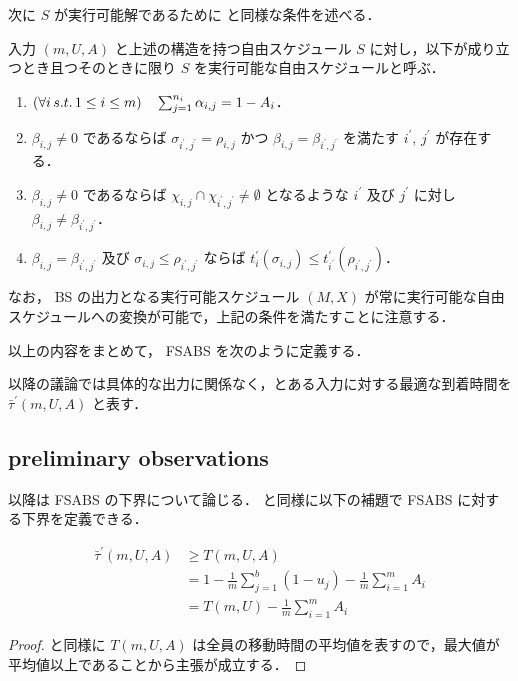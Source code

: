 次に $S$ が実行可能解であるために \textcite{czyzowicz} と同様な条件を述べる．
\begin{definition}
  入力 $(m, U, A)$ と上述の構造を持つ自由スケジュール $S$ に対し，以下が成り立つとき且つそのときに限り $S$ を実行可能な自由スケジュールと呼ぶ．
  \begin{enumerate}
  \item $(\forall i\,s.t.\, 1 \leq i \leq m)\quad \sum_{j=1}^{n_i} \alpha_{i,j} = 1 - A_i$．
  \item $\beta_{i,j} \neq 0$ であるならば $\sigma_{i^\prime, j^\prime} = \rho_{i,j} \text{ かつ } \beta_{i,j} = \beta_{i^\prime, j^\prime}$ を満たす $i^\prime$, $j^\prime$ が存在する．
  \item $\beta_{i,j} \neq 0$ であるならば $\chi_{i,j} \cap \chi_{i^\prime,j^\prime} \neq \emptyset$ となるような $i^\prime$ 及び $j^\prime$ に対し $\beta_{i,j} \neq \beta_{i^\prime,j ^\prime}$．
  \item $\beta_{i,j} = \beta_{i^\prime, j^\prime}$ 及び $\sigma_{i,j} \leq \rho_{i^\prime, j^{\prime}}$ ならば $t^{\prime}_i(\sigma_{i, j}) \leq t^{\prime}_{i^\prime}(\rho_{i^\prime, j^\prime})$．
  \end{enumerate}
\end{definition}
なお， BS の出力となる実行可能スケジュール $(M, X)$ が常に実行可能な自由スケジュールへの変換が可能で，上記の条件を満たすことに注意する．

以上の内容をまとめて， FSABS を次のように定義する．
\begin{problem}
\end{problem}
以降の議論では具体的な出力に関係なく，とある入力に対する最適な到着時間を $\bar\tau^\prime(m, U, A)$ と表す．

\subsection{preliminary observations}

以降は FSABS の下界について論じる．  と同様に以下の補題で FSABS に対する下界を定義できる．
\begin{lemma}
  \begin{align}
    \bar\tau^{\prime}(m, U, A) &\geq T(m, U, A) \\
                      &= 1 - \frac{1}{m}\sum_{j = 1}^b (1 - u_j) - \frac{1}{m}\sum_{i = 1}^{m} A_i \\
                      &= T(m, U) - \frac{1}{m}\sum_{i = 1}^{m} A_i
  \end{align}
\end{lemma}
\begin{proof}
   と同様に $T(m, U, A)$ は全員の移動時間の平均値を表すので，最大値が平均値以上であることから主張が成立する．
\end{proof}

